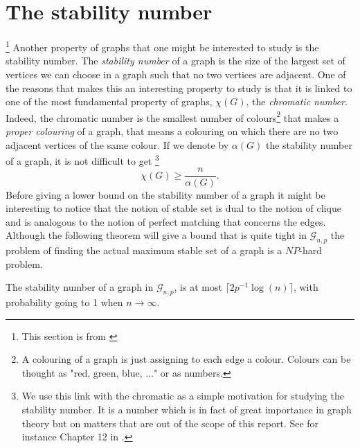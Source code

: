 \section{The stability number}
\footnote{This section is from \cite{Bondy08}}
Another property of graphs that one might be interested to study is the stability number. The \emph{stability number} of a graph is the size of the largest set of vertices we can choose in a graph such that no two vertices are adjacent. 
One of the reasons that makes this an interesting property to study is that it is linked to one of the most fundamental property of graphs, $\chi (G)$, the \emph{chromatic number}. 
Indeed, the chromatic number is the smallest number of colours\footnote{A colouring of a graph is just assigning to each edge a colour. Colours can be thought as "red, green, blue, ..." or as numbers.} that makes a \emph{proper colouring} of a graph, 
that means a colouring on which there are no two adjacent vertices of the same colour. 
If we denote by $\alpha(G)$ the stability number of a graph, it is not difficult to get \footnote{ We use this link with the chromatic as a simple motivation for studying the stability number. It is a number which is in fact of great importance in graph theory but on matters that are out of the scope of this report. See for instance Chapter 12 in \cite{Bondy08}.}
\begin{equation}
	\chi(G) \geq \frac{n}{\alpha(G)}.
\end{equation}
Before giving a lower bound on the stability number of a graph it might be interesting to notice that the notion of stable set is dual to the notion of clique and is analogous to the notion of perfect matching that concerns the edges.
Although the following theorem will give a bound that is quite tight in $\mathcal{G}_{n, p}$ the problem of finding the actual maximum stable set of a graph is a $NP$-hard problem.
\begin{theorem}
	The stability number of a graph in $\mathcal{G}_{n, p}$, is at most $\lceil 2p^{-1}\log(n)\rceil$, with probability going to 1 when $n \longrightarrow \infty$.
\end{theorem}
